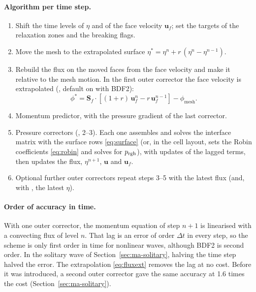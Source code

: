 \paragraph{Algorithm per time step.}
\begin{enumerate}[nosep]
  \item Shift the time levels of $\eta$ and of the face velocity $\bm{u}_f$; set the
        targets of the relaxation zones and the breaking flags.
  \item Move the mesh to the extrapolated surface
        $\eta^{*} = \eta^n + r\,(\eta^n - \eta^{n-1})$.
  \item Rebuild the flux on the moved faces from the face velocity and make
        it relative to the mesh motion. In the first outer corrector the face
        velocity is extrapolated (, default on with
        BDF2):
        \begin{equation}
          \phi^{*} = \bm{S}_f\cdot\left[(1+r)\,\bm{u}_f^{n} - r\,\bm{u}_f^{n-1}\right] - \phi_{\mathrm{mesh}} .
          \label{eq:fluxext}
        \end{equation}
  \item Momentum predictor, with the pressure gradient of the last corrector.
  \item Pressure correctors (, 2--3). Each one assembles and
        solves the interface matrix with the surface rows \eqref{eq:surface}
        (or, in the cell layout, sets the Robin coefficients \eqref{eq:robin}
        and solves for $p_{\mathrm{rgh}}$), with  updates
        of the lagged terms, then updates the flux, $\eta^{n+1}$, $\bm{u}$ and
        $\bm{u}_f$.
  \item Optional further outer correctors repeat steps 3--5 with the latest
        flux (and, with , the latest $\eta$).
\end{enumerate}

\paragraph{Order of accuracy in time.} With one outer corrector, the momentum
equation of step $n+1$ is linearised with a convecting flux of level $n$. That
lag is an error of order $\Delta t$ in every step, so the scheme is only first
order in time for nonlinear waves, although BDF2 is second order. In the
solitary wave of Section~\ref{sec:ma-solitary}, halving the time step halved
the error. The extrapolation \eqref{eq:fluxext} removes the lag at no cost.
Before it was introduced, a second outer corrector gave the same accuracy at
1.6 times the cost (Section~\ref{sec:ma-solitary}).

